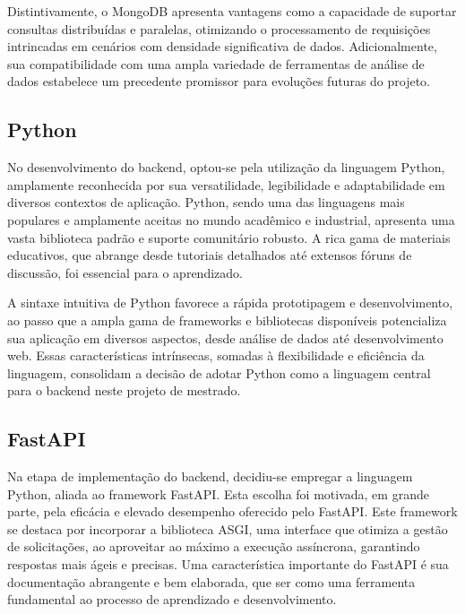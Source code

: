 Distintivamente, o MongoDB apresenta vantagens como a capacidade de suportar consultas distribuídas e paralelas, otimizando o processamento de requisições intrincadas em cenários com densidade significativa de dados. Adicionalmente, sua compatibilidade com uma ampla variedade de ferramentas de análise de dados estabelece um precedente promissor para evoluções futuras do projeto.

\subsection{Python}
No desenvolvimento do backend, optou-se pela utilização da linguagem Python, amplamente reconhecida por sua versatilidade, legibilidade e adaptabilidade em diversos contextos de aplicação. Python, sendo uma das linguagens mais populares e amplamente aceitas no mundo acadêmico e industrial, apresenta uma vasta biblioteca padrão e suporte comunitário robusto. A rica gama de materiais educativos, que abrange desde tutoriais detalhados até extensos fóruns de discussão, foi essencial para o aprendizado.

A sintaxe intuitiva de Python favorece a rápida prototipagem e desenvolvimento, ao passo que a ampla gama de frameworks e bibliotecas disponíveis potencializa sua aplicação em diversos aspectos, desde análise de dados até desenvolvimento web. Essas características intrínsecas, somadas à flexibilidade e eficiência da linguagem, consolidam a decisão de adotar Python como a linguagem central para o backend neste projeto de mestrado.


\subsection{FastAPI}
Na etapa de implementação do backend, decidiu-se empregar a linguagem Python, aliada ao framework FastAPI. Esta escolha foi motivada, em grande parte, pela eficácia e elevado desempenho oferecido pelo FastAPI. Este framework se destaca por incorporar a biblioteca \gls{ASGI}, uma interface que otimiza a gestão de solicitações, ao aproveitar ao máximo a execução assíncrona, garantindo respostas mais ágeis e precisas. Uma característica importante do FastAPI é sua documentação abrangente e bem elaborada, que ser como uma ferramenta fundamental ao processo de aprendizado e desenvolvimento.

